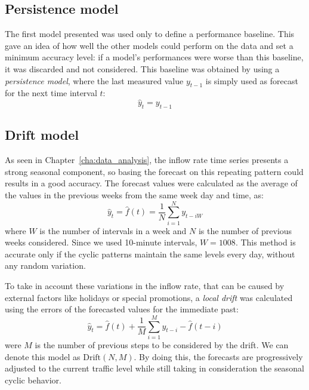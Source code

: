 \subsection{Persistence model}
\label{subsec:persistence_model}

The first model presented was used only to define a performance baseline. This gave an idea of how well the other models could perform on the data and set a minimum accuracy level: if a model’s performances were worse than this baseline, it was discarded and not considered. This baseline was obtained by using a \emph{persistence model}, where the last measured value \( y_{t-1} \) is simply used as forecast for the next time interval \( t \):
\begin{equation}
  \hat{y}_t = y_{t-1}
\end{equation}

\subsection{Drift model}
\label{subsec:drift_model}

As seen in Chapter~\ref{cha:data_analysis}, the inflow rate time series presents a strong seasonal component, so basing the forecast on this repeating pattern could results in a good accuracy. The forecast values were calculated as the average of the values in the previous weeks from the same week day and time, as:
\begin{equation}
  \hat{y}_t = \hat{f}(t) = \frac{1}{N} \sum_{i=1}^{N} y_{t-iW}
\end{equation}
where \( W \) is the number of intervals in a week and \( N \) is the number of previous weeks considered. Since we used 10-minute intervals, \( W = 1008 \). This method is accurate only if the cyclic patterns maintain the same levels every day, without any random variation.

To take in account these variations in the inflow rate, that can be caused by external factors like holidays or special promotions, a \emph{local drift} was calculated using the errors of the forecasted values for the immediate past:
\begin{equation}
  \hat{y}_t = \hat{f}(t) + \frac{1}{M} \sum_{i=1}^{M} y_{t-i} - \hat{f}(t-i)
\end{equation}
were \( M \) is the number of previous steps to be considered by the drift. We can denote this model as \( \text{Drift}(N, M) \). By doing this, the forecasts are progressively adjusted to the current traffic level while still taking in consideration the seasonal cyclic behavior.


